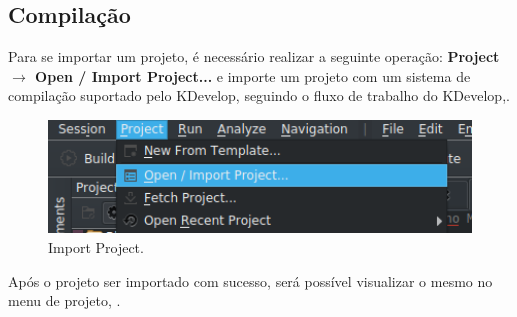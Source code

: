 \subsection{Compilação}

Para se importar um projeto, é necessário realizar a seguinte operação: \textbf{Project $\rightarrow$ Open / Import Project...} e importe um projeto com um sistema de compilação suportado pelo KDevelop, seguindo o fluxo de trabalho do KDevelop,.

\begin{figure}[!htb]
  \centering
  \caption[Import Project]{Import Project.}
  \label{fig:importproject}
  \includegraphics[width=1\textwidth]{figuras/importproject.png}
\end{figure}

Após o projeto ser importado com sucesso, será possível visualizar o mesmo no menu de projeto, .

